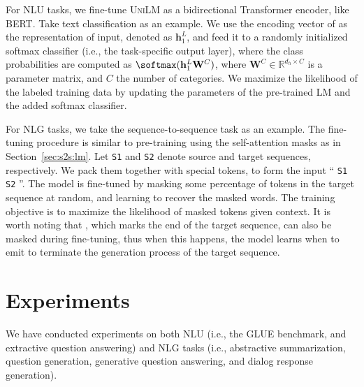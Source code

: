 \documentclass{article}
\newcommand\ours{\textsc{UniLM}}
\begin{document}


For NLU tasks, we fine-tune \ours{} as a bidirectional Transformer encoder, like BERT. Take text classification as an example. We use the encoding vector of  as the representation of input, denoted as $\mathbf{h}_1^L$, and
feed it to a randomly initialized softmax classifier (i.e., the task-specific output layer), where 
the class probabilities are computed as $\softmax( \mathbf{h}_1^L \mathbf{W}^C )$, where $\mathbf{W}^C \in \mathbb{R}^{d_h \times C}$ is a parameter matrix, and $C$ the number of categories. 
We maximize the likelihood of the labeled training data by updating the parameters of the pre-trained LM and the added softmax classifier. 

For NLG tasks, we take the sequence-to-sequence task as an example. The fine-tuning procedure is similar to pre-training using the self-attention masks as in Section~\ref{sec:s2s:lm}.
Let \texttt{S1} and \texttt{S2} denote source and target sequences, respectively. 
We pack them together with special tokens, to form the input `` \texttt{S1}  \texttt{S2} ''.
The model is fine-tuned by masking some percentage of tokens in the target sequence at random, and learning to recover the masked words. 
The training objective is to maximize the likelihood of masked tokens given context.
It is worth noting that , which marks the end of the target sequence, can also be masked during fine-tuning, thus when this happens, the model learns when to emit  to terminate the generation process of the target sequence.


\section{Experiments}
\label{sec:exp}

We have conducted experiments on both NLU (i.e., the GLUE benchmark, and extractive question answering) and NLG tasks (i.e., abstractive summarization, question generation, generative question answering, and dialog response generation). 
\end{document}
